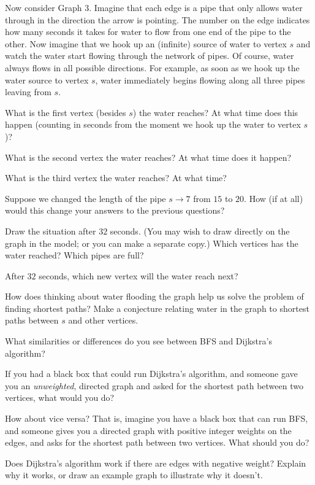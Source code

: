 \documentclass{tufte-handout}
\begin{document}
Now consider Graph 3.  Imagine that each edge is a pipe that only
allows water through in the direction the arrow is pointing.  The
number on the edge indicates how many seconds it takes for water to
flow from one end of the pipe to the other.  Now imagine that we hook
up an (infinite) source of water to vertex $s$ and watch the water
start flowing through the network of pipes.  Of course, water always
flows in all possible directions.  For example, as soon as we hook up
the water source to vertex $s$, water immediately begins flowing
along all three pipes leaving from $s$.
\begin{questions}
  \item What is the first vertex (besides $s$) the water reaches?  At
    what time does this happen (counting in seconds from the moment we
    hook up the water to vertex $s$)?
  \item What is the second vertex the water reaches?  At what time
    does it happen?
  \item What is the third vertex the water reaches?  At what time?
  \item Suppose we changed the length of the pipe $s \to 7$ from $15$
    to $20$.  How (if at all) would this change your answers to the
    previous questions?
  \item Draw the situation after $32$ seconds.  (You may wish to draw
    directly on the graph in the model; or you can make a separate
    copy.)  Which vertices has the water reached?  Which pipes are
    full?
  \item After $32$ seconds, which new vertex will the water reach next?
  \item How does thinking about water flooding the graph help us solve
    the problem of finding shortest paths?  Make a conjecture relating water in
    the graph to shortest paths between $s$ and other vertices.
\end{questions}

\pause

\begin{questions}
\item What similarities or differences do you see between BFS and
  Dijkstra's algorithm?
\item If you had a black box that could run Dijkstra's algorithm, and
  someone gave you an \emph{unweighted}, directed graph and asked for
  the shortest path between two vertices, what would you do?
\item How about vice versa?  That is, imagine you have a black box
  that can run BFS, and someone gives you a directed graph
  with positive integer weights on the edges, and asks for the
  shortest path between two vertices.  What should you do?
\item Does Dijkstra's algorithm work if there are edges with negative
  weight?  Explain why it works, or draw an example graph to illustrate
  why it doesn't.
\end{questions}
\end{document}
